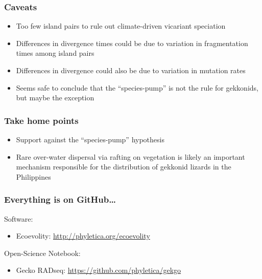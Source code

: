 \begin{frame}
    \frametitle{Caveats}
    \begin{itemize}
        \item Too few island pairs to rule out climate-driven vicariant
            speciation
        \item Differences in divergence times could be due to variation in
            fragmentation times among island pairs
        \item Differences in divergence could also be due to variation
            in mutation rates
    \end{itemize}

    \vspace{1cm}
    \begin{itemize}
        \item<2-> Seems safe to conclude that the ``species-pump'' is not the
            rule for gekkonids, but maybe the exception
    \end{itemize}
\end{frame}

\begin{frame}
    \frametitle{Take home points}
    \begin{itemize}
        \item<1-> Support against the ``species-pump'' hypothesis
        \item<2-> Rare over-water dispersal via rafting on vegetation is likely
            an important mechanism responsible for the distribution of gekkonid
            lizards in the Philippines
    \end{itemize}
\end{frame}

% 
\begin{frame}
    \frametitle{Everything is on GitHub\ldots}
    Software:\\
    \begin{itemize}
        \item Ecoevolity:
            \url{http://phyletica.org/ecoevolity}
    \end{itemize}

    \medskip
    Open-Science Notebook:\\
    \begin{itemize}
        \item Gecko RADseq:
            \url{https://github.com/phyletica/gekgo}
    \end{itemize}
\end{frame}

